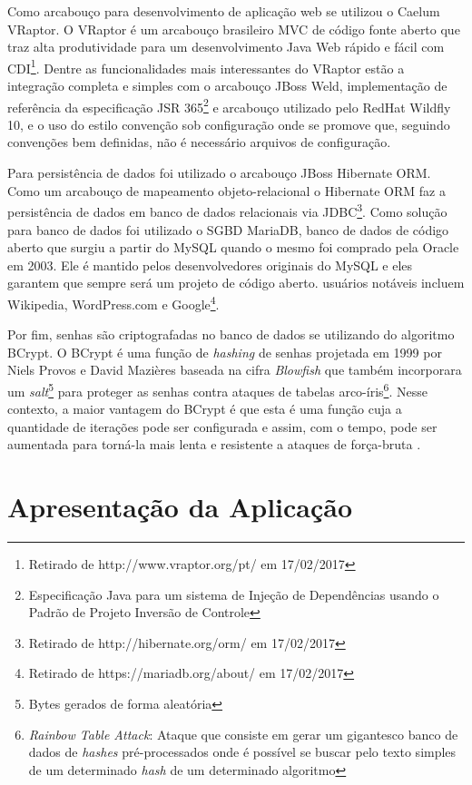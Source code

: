 Como arcabouço para desenvolvimento de aplicação web se utilizou o Caelum VRaptor. O VRaptor é um arcabouço brasileiro MVC de código fonte aberto que traz alta produtividade para um desenvolvimento Java Web rápido e fácil com CDI\footnote{Retirado de http://www.vraptor.org/pt/ em 17/02/2017}. Dentre as funcionalidades mais interessantes do VRaptor estão a integração completa e simples com o arcabouço JBoss Weld, implementação de referência da especificação JSR 365\footnote{Especificação Java para um sistema de Injeção de Dependências usando o Padrão de Projeto Inversão de Controle} e arcabouço utilizado pelo RedHat Wildfly 10, e o uso do estilo convenção sob configuração onde se promove que, seguindo convenções bem definidas, não é necessário arquivos de configuração.

Para persistência de dados foi utilizado o arcabouço JBoss Hibernate ORM. Como um arcabouço de mapeamento objeto-relacional o Hibernate ORM faz a persistência de dados em banco de dados relacionais via JDBC\footnote{Retirado de http://hibernate.org/orm/ em 17/02/2017}. Como solução para banco de dados foi utilizado o SGBD MariaDB, banco de dados de código aberto que surgiu a partir do MySQL quando o mesmo foi comprado pela Oracle em 2003. Ele é mantido pelos desenvolvedores originais do MySQL e eles garantem que sempre será um projeto de código aberto. usuários notáveis incluem Wikipedia, WordPress.com e Google\footnote{Retirado de https://mariadb.org/about/ em 17/02/2017}.

Por fim, senhas são criptografadas no banco de dados se utilizando do algoritmo BCrypt. O BCrypt é uma função de \emph{hashing} de senhas projetada em 1999 por Niels Provos e David Mazières baseada na cifra \emph{Blowfish} que também incorporara um \emph{salt}\footnote{Bytes gerados de forma aleatória} para proteger as senhas contra ataques de tabelas arco-íris\footnote{\emph{Rainbow Table Attack}: Ataque que consiste em gerar um gigantesco banco de dados de \emph{hashes} pré-processados onde é possível se buscar pelo texto simples de um determinado \emph{hash} de um determinado algoritmo}. Nesse contexto, a maior vantagem do BCrypt é que esta é uma função cuja a quantidade de iterações pode ser configurada e assim, com o tempo, pode ser aumentada para torná-la mais lenta e resistente a ataques de força-bruta \cite{wiki:Bcrypt}.





\section{Apresentação da Aplicação} \label{sec:ajudaai:apresentacao}

